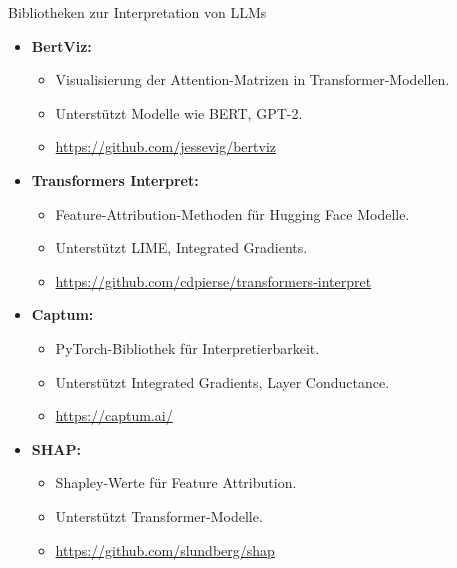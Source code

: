 \documentclass[aspectratio=1610, xcolor=dvipsnames, 9pt]{beamer}
\begin{document}
\begin{frame}{Bibliotheken zur Interpretation von LLMs}
  \begin{itemize}
    \item \textbf{BertViz:}
    \begin{itemize}
      \item Visualisierung der Attention-Matrizen in Transformer-Modellen.
      \item Unterstützt Modelle wie BERT, GPT-2.
      \item \url{https://github.com/jessevig/bertviz}
    \end{itemize}
    \item \textbf{Transformers Interpret:}
    \begin{itemize}
      \item Feature-Attribution-Methoden für Hugging Face Modelle.
      \item Unterstützt LIME, Integrated Gradients.
      \item \url{https://github.com/cdpierse/transformers-interpret}
    \end{itemize}
    \item \textbf{Captum:}
    \begin{itemize}
      \item PyTorch-Bibliothek für Interpretierbarkeit.
      \item Unterstützt Integrated Gradients, Layer Conductance.
      \item \url{https://captum.ai/}
    \end{itemize}
    \item \textbf{SHAP:}
    \begin{itemize}
      \item Shapley-Werte für Feature Attribution.
      \item Unterstützt Transformer-Modelle.
      \item \url{https://github.com/slundberg/shap}
    \end{itemize}
  \end{itemize}
\end{frame}
\end{document}
